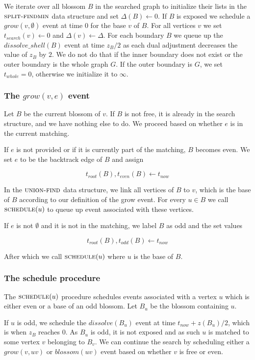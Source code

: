 We iterate over all blossom $B$ in the searched graph to initialize their lists in the $\textsc{split-findmin}$ data structure and set $\Delta(B) \gets 0$. If $B$ is exposed we schedule a $grow(v, \emptyset)$ event at time $0$ for the base $v$ of $B$. For all vertices $v$ we set $t_{search}(v) \gets 0$ and $\Delta(v) \gets \Delta$. For each boundary $B$ we queue up the $dissolve\_shell(B)$ event at time $z_B / 2$ as each dual adjustment decreases the value of $z_B$ by $2$. We do not do that if the inner boundary does not exist or the outer boundary is the whole graph $G$. If the outer boundary is $G$, we set $t_{whole} = 0$, otherwise we initialize it to $\infty$.

\subsubsection*{The $grow(v, e)$ event}
Let $B$ be the current blossom of $v$. If $B$ is not free, it is already in the search structure, and we have nothing else to do. We proceed based on whether $e$ is in the current matching.

If $e$ is not provided or if it is currently part of the matching, $B$ becomes even. We set $e$ to be the backtrack edge of $B$ and assign

\[ t_{root}(B), t_{even}(B) \gets t_{now} \]

In the $\textsc{union-find}$ data structure, we link all vertices of $B$ to $v$, which is the base of $B$ according to our definition of the grow event. For every $u \in B$ we call $\textsc{schedule}(u)$ to queue up event associated with these vertices.

If $e$ is not $\emptyset$ and it is not in the matching, we label $B$ as odd and the set values

\[ t_{root}(B), t_{odd}(B) \gets t_{now} \]

After which we call $\textsc{schedule}(u)$ where $u$ is the base of $B$.

\subsubsection*{The schedule procedure}
The $\textsc{schedule}(u)$ procedure schedules events associated with a vertex $u$ which is either even or a base of an odd blossom. Let $B_u$ be the blossom containing $u$. 

If $u$ is odd, we schedule the $dissolve(B_u)$ event at time $t_{now} + z(B_u) / 2$, which is when $z_B$ reaches $0$. As $B_u$ is odd, it is not exposed and as such $u$ is matched to some vertex $v$ belonging to $B_v$. We can continue the search by scheduling either a $grow(v, uv)$ or $blossom(uv)$ event based on whether $v$ is free or even.

